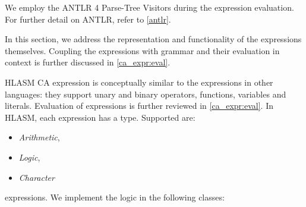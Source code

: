 We employ the ANTLR 4 Parse-Tree Visitors during the expression evaluation. For further detail on ANTLR, refer to \cref{antlr}.

In this section, we address the representation and functionality of the expressions themselves. Coupling the expressions with grammar and their evaluation in context is further discussed in \cref{ca_expr:eval}.

HLASM CA expression is conceptually similar to the expressions in other languages: they support unary and binary operators, functions, variables and literals. Evaluation of expressions is further reviewed in \cref{ca_expr:eval}. In HLASM, each expression has a type. Supported are:

\begin{itemize}
	\item  \emph{Arithmetic},
	\item  \emph{Logic},
	\item  \emph{Character}
\end{itemize}

expressions. We implement the logic in the following classes:

